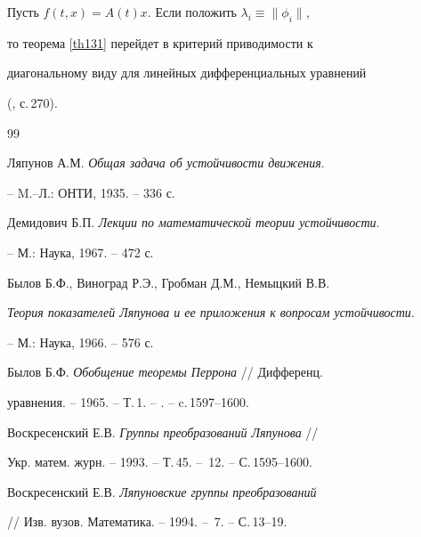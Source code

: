 Пусть $f(t,x)=A(t)x$. Если положить $\lambda_{i}\equiv\|\phi_{i}\|$,


то теорема \ref{th131} перейдет в критерий приводимости к 


диагональному виду для линейных дифференциальных уравнений


(\cite{BilTe}, с.\,270). 





\begin{thebibliography}{99}







Ляпунов А.М. {\em Общая задача об устойчивости движения}.


-- M.--Л.: ОНТИ, 1935. -- 336 с.







Демидович Б.П. {\em Лекции по математической теории устойчивости}. 


-- М.: Наука, 1967. -- 472 с.







Былов Б.Ф., Виноград Р.Э., Гробман Д.М., Немыцкий В.В.


{\em Теория показателей Ляпунова и ее приложения к вопросам устойчивости}.


-- М.: Наука, 1966. -- 576 с.







Былов Б.Ф. {\em Обобщение теоремы Перрона} // Дифференц.


уравнения. -- 1965. -- Т.\,1. -- . -- c.\,1597--1600.







Воскресенский Е.В. {\em Группы преобразований Ляпунова} // 


Укр. матем. журн. -- 1993. -- Т.\,45. -- \No\,12. -- С.\,1595--1600. 







Воскресенский Е.В. {\em Ляпуновские группы преобразований}


// Изв. вузов. Математика. -- 1994. -- \No\,7. -- С.\,13--19. 






\end{thebibliography}
